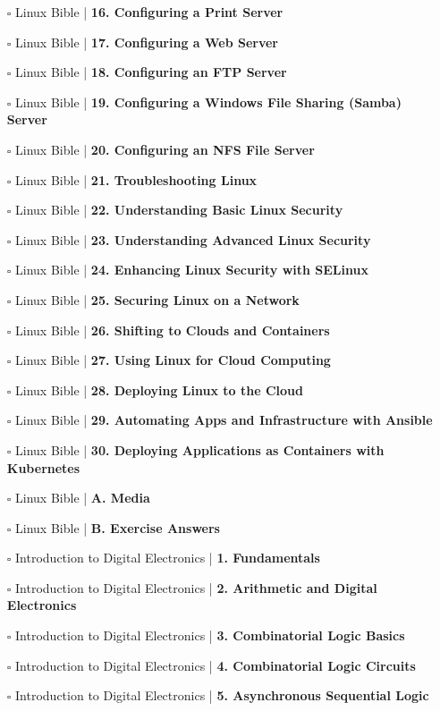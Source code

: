 \documentclass[a4, landscape, 12pt]{article}
\newcommand{\checkbox}{$\square$}%
\begin{document}
\begin{itemize}
{}
\item [\checkbox]  Linux Bible | \textbf{ 16. Configuring a Print Server
}
\item [\checkbox]  Linux Bible | \textbf{ 17. Configuring a Web Server
}
\item [\checkbox]  Linux Bible | \textbf{ 18. Configuring an FTP Server
}
\item [\checkbox]  Linux Bible | \textbf{ 19. Configuring a Windows File Sharing (Samba) Server
}
\item [\checkbox]  Linux Bible | \textbf{ 20. Configuring an NFS File Server
}
\item [\checkbox]  Linux Bible | \textbf{ 21. Troubleshooting Linux
}
\item [\checkbox]  Linux Bible | \textbf{ 22. Understanding Basic Linux Security
}
\item [\checkbox]  Linux Bible | \textbf{ 23. Understanding Advanced Linux Security
}
\item [\checkbox]  Linux Bible | \textbf{ 24. Enhancing Linux Security with SELinux
}
\item [\checkbox]  Linux Bible | \textbf{ 25. Securing Linux on a Network
}
\item [\checkbox]  Linux Bible | \textbf{ 26. Shifting to Clouds and Containers
}
\item [\checkbox]  Linux Bible | \textbf{ 27. Using Linux for Cloud Computing
}
\item [\checkbox]  Linux Bible | \textbf{ 28. Deploying Linux to the Cloud
}
\item [\checkbox]  Linux Bible | \textbf{ 29. Automating Apps and Infrastructure with Ansible
}
\item [\checkbox]  Linux Bible | \textbf{ 30. Deploying Applications as Containers with Kubernetes
}
\item [\checkbox]  Linux Bible | \textbf{ A. Media
}
\item [\checkbox]  Linux Bible | \textbf{ B. Exercise Answers
}
\item [\checkbox]  Introduction to Digital Electronics | \textbf{ 1. Fundamentals
}
\item [\checkbox]  Introduction to Digital Electronics | \textbf{ 2. Arithmetic and Digital Electronics
}
\item [\checkbox]  Introduction to Digital Electronics | \textbf{ 3. Combinatorial Logic Basics
}
\item [\checkbox]  Introduction to Digital Electronics | \textbf{ 4. Combinatorial Logic Circuits
}
\item [\checkbox]  Introduction to Digital Electronics | \textbf{ 5. Asynchronous Sequential Logic
}
\end{itemize}
\end{document}
